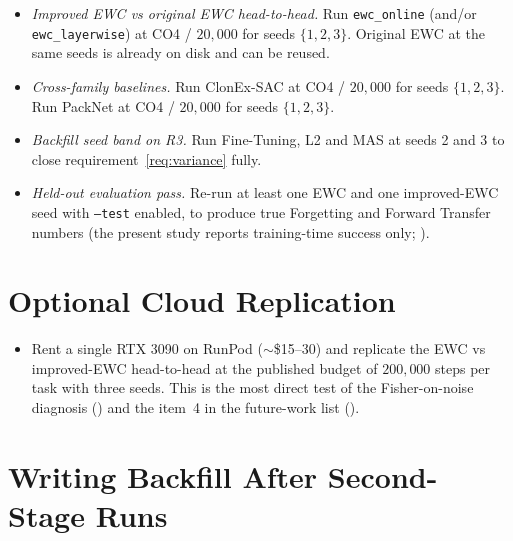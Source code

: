 \begin{itemize}
    \item \emph{Improved EWC vs original EWC head-to-head.} Run
        \texttt{ewc\_online} (and/or \texttt{ewc\_layerwise}) at
        CO4 / $20{,}000$ for seeds $\{1,2,3\}$. Original EWC at the
        same seeds is already on disk and can be reused.
    \item \emph{Cross-family baselines.} Run ClonEx-SAC at CO4 /
        $20{,}000$ for seeds $\{1,2,3\}$. Run PackNet at CO4 /
        $20{,}000$ for seeds $\{1,2,3\}$.
    \item \emph{Backfill seed band on R3.} Run Fine-Tuning, L2 and
        MAS at seeds 2 and 3 to close requirement~\ref{req:variance}
        fully.
    \item \emph{Held-out evaluation pass.} Re-run at least one EWC
        and one improved-EWC seed with \texttt{--test} enabled, to
        produce true Forgetting and Forward Transfer numbers (the
        present study reports training-time success only;
        ).
\end{itemize}

\section*{Optional Cloud Replication}

\begin{itemize}
    \item Rent a single RTX 3090 on RunPod ($\sim$\$15--30) and
        replicate the EWC vs improved-EWC head-to-head at the
        published budget of $200{,}000$ steps per task with three
        seeds. This is the most direct test of the
        Fisher-on-noise diagnosis () and the
        item~4 in the future-work list ().
\end{itemize}

\section*{Writing Backfill After Second-Stage Runs}

